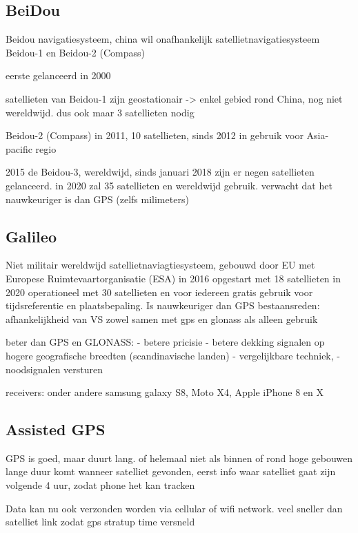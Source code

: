 \iffalse
GLONASS engels wikipedia, receivers companies en smartphone comapanies die gebruik maken
GLONASS nl wikipedia: vergelijking met anderee systemen
\fi



\subsection{BeiDou}
Beidou navigatiesysteem, china wil onafhankelijk satellietnavigatiesysteem
Beidou-1 en Beidou-2 (Compass)

eerste gelanceerd in 2000

satellieten van Beidou-1 zijn geostationair -> enkel gebied rond China, nog niet wereldwijd.
dus ook maar 3 satellieten nodig

Beidou-2 (Compass) in 2011, 10 satellieten, sinds 2012 in gebruik voor Asia-pacific regio

2015 de Beidou-3, wereldwijd, sinds januari 2018 zijn er negen satellieten gelanceerd. in 2020 zal 35 satellieten en wereldwijd gebruik. verwacht dat het nauwkeuriger is dan GPS (zelfs milimeters) 


\subsection{Galileo}
Niet militair wereldwijd satellietnaviagtiesysteem, gebouwd door EU met Europese Ruimtevaartorganisatie (ESA)
in 2016 opgestart met 18 satellieten
in 2020 operationeel met 30 satellieten en voor iedereen gratis gebruik voor tijdsreferentie en plaatsbepaling.
Is nauwkeuriger dan GPS
bestaansreden: afhankelijkheid van VS
zowel samen met gps en glonass als alleen gebruik

beter dan GPS en GLONASS:
	- betere pricisie
	- betere dekking signalen op hogere geografische breedten (scandinavische landen)
	- vergelijkbare techniek, 
	- noodsignalen versturen
	
receivers:
onder andere samsung galaxy S8, Moto X4, Apple iPhone 8 en X



\subsection{Assisted GPS}
GPS is goed, maar duurt lang. of helemaal niet als binnen of rond hoge gebouwen
lange duur komt wanneer satelliet gevonden, eerst info waar satelliet gaat zijn volgende 4 uur, zodat phone het kan tracken

Data kan nu ook verzonden worden via cellular of wifi network. veel sneller dan satelliet link
zodat gps stratup time versneld

